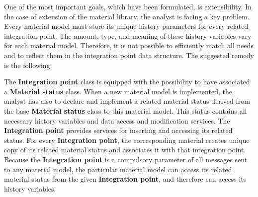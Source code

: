 \documentclass[a4paper]{article}
\newcommand{\class}[1]{{\bf #1}}
\begin{document}
One of the most important goals, which have been formulated, is
extensibility. In the case of extension of the material library, the
analyst is facing  a key problem. Every material model must store
its unique history parameters for every related integration point. The
amount, type, and meaning of these history variables vary for each
material model. Therefore, it is not possible to efficiently
match all needs and to reflect them in the integration point data
structure. The suggested remedy is the following:

The \class{Integration point}  class is equipped with the possibility to have
associated a \class{Material status} class. When a new material model is
implemented, the analyst has also to declare and implement a related
material status derived from the base
\class{Material status} class to this material model. This status contains all necessary
history variables and data access and modification
services. The \class{Integration point} provides services for inserting and
accessing its related status. For every  \class{Integration point},
the corresponding material creates unique copy of its related material
status and associates it with that integration point. Because
the \class{Integration point} is a compulsory parameter of all messages sent to
any material model, the particular material model can access its
related material status from the given \class{Integration point}, and therefore can access its
history variables. 



\end{document}
